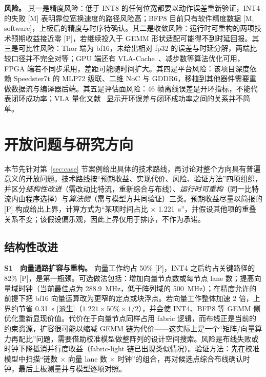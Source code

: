 \documentclass[a4paper,10.5pt]{ctexart}
\newcommand{\tM}{\textsf{[M]}}              %
\newcommand{\tP}{\textsf{[P]}}              %
\newcommand{\tMsw}{\textsf{[M, software]}}  %
\newcommand{\tD}{\textsf{[派生]}}           %
\begin{document}
\textbf{风险。} 其一是精度风险：低于 INT8 的任何位宽都要以动作误差重新验证，INT4 的失败 \tM{} 表明靠位宽换速度的路径风险高；BFP8 目前只有软件精度数据 \tMsw，上板后的精度与时序待确认。其二是收敛风险：运行时可重构的两项技术预期收益接近零 \tP，若继续投入于 GEMM 形状适配可能得不到时延回报。其三是可比性风险：Thor 端为 bf16，未给出相对 fp32 的误差与时延分解，两端比较口径并不完全对等；GPU 端还有 VLA-Cache~\cite{vlacache}、减步数等算法优化可用，FPGA 端若不同步采用，差距可能随时间扩大。其四是平台风险：该项目深度依赖 Speedster7t 的 MLP72 级联、二维 NoC 与 GDDR6，移植到其他器件需要重做数据流与编译器后端。其五是评估面风险：46 帧离线误差是开环指标，不能代表闭环成功率；VLA 量化文献~\cite{vlaquantbench} 显示开环误差与闭环成功率之间的关系并不简单。

\section{开放问题与研究方向}\label{sec:future}

本节先针对第~\ref{sec:case} 节案例给出具体的技术路线，再讨论对整个方向具有普遍意义的开放问题。技术路线按“预期收益、实现代价、风险、验证方法”四项组织，并区分\emph{结构性改进}（需改动比特流，重新综合与布线）、\emph{运行时可重构}（同一比特流内由程序选择）与\emph{算法侧}（需与模型方共同验证）三类。预期收益尽量以简报的 \tP{} 构成给出上界，计算方式为“某项时间占比 $\times$ 1.221~s”，并假设其他项的重叠关系不变；该假设偏乐观，因此上界仅用于排序，不作为承诺。

\subsection{结构性改进}

\textbf{S1　向量通路扩容与重构。} 向量工作约占 50\% \tP，INT4 之后约占关键路径的 82\% \tP，是第一瓶颈。可选做法包括：增加向量节点数或每节点 lane 数；提高向量域时钟（当前最佳点为 288.9~MHz，低于阵列域的 500~MHz）；在精度允许的前提下把 bf16 向量运算改为更窄的定点或块浮点。若向量工作整体加速 2 倍，上界约节省 0.31~s \tD（$1.221\times50\%\times1/2$），并会使 INT4、BFP8 等 GEMM 侧优化重新显现价值。代价在于向量节点同样占用 fabric 逻辑，而布线正是当前的约束资源，扩容很可能以缩减 GEMM 链为代价——这实际上是一个“矩阵/向量算力再配比”问题，需要借助校准模型做整阵列的设计空间搜索。风险是布线失败或时钟下降抵消并行度收益（fabric-light 链已出现类似情况）。验证方法：先在校准模型中扫描“链数 $\times$ 向量 lane 数 $\times$ 时钟”的组合，再对候选点综合布线确认时钟，最后上板测量并与模型逐项对照。
\end{document}
